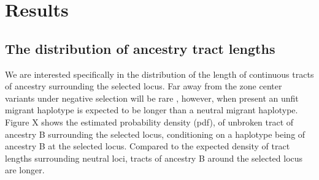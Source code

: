 \documentclass[12pt]{article}
\begin{document}

\section{Results}
\subsection{The distribution of ancestry tract lengths}
We are interested specifically in the distribution of the length of continuous tracts of ancestry surrounding the selected locus. Far away from the zone center variants under negative selection will be rare \citep[for demonstration of this theoretical result, see e.g.][]{May1975,Slatkin1973,Barton??}, however, when present an unfit migrant haplotype is expected to be longer than a neutral migrant haplotype. Figure X shows the estimated probability density (pdf), of unbroken tract of ancestry B surrounding the selected locus, conditioning on a haplotype being of ancestry B at the selected locus. Compared to the expected density of tract lengths surrounding neutral loci, tracts of ancestry B around the selected locus are longer.
\end{document}

